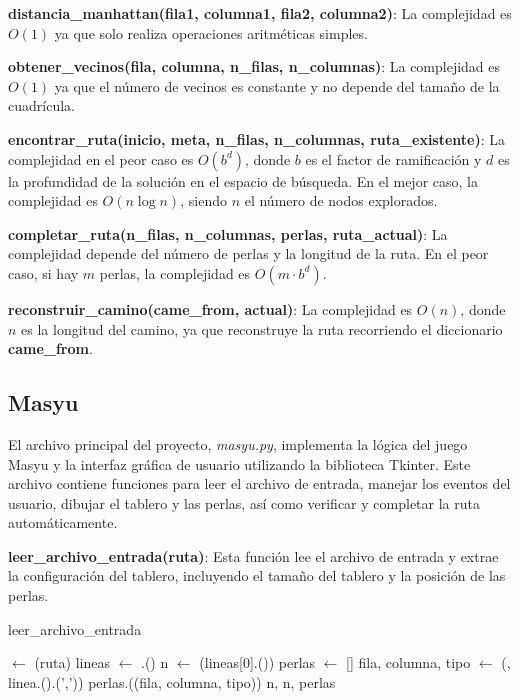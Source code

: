 \documentclass{article}
\begin{document}
\textbf{distancia\_manhattan(fila1, columna1, fila2, columna2)}: La complejidad es \(O(1)\) ya que solo realiza operaciones aritméticas simples.

\textbf{obtener\_vecinos(fila, columna, n\_filas, n\_columnas)}: La complejidad es \(O(1)\) ya que el número de vecinos es constante y no depende del tamaño de la cuadrícula.

\textbf{encontrar\_ruta(inicio, meta, n\_filas, n\_columnas, ruta\_existente)}: La complejidad en el peor caso es \(O(b^d)\), donde \(b\) es el factor de ramificación y \(d\) es la profundidad de la solución en el espacio de búsqueda. En el mejor caso, la complejidad es \(O(n \log n)\), siendo \(n\) el número de nodos explorados.

\textbf{completar\_ruta(n\_filas, n\_columnas, perlas, ruta\_actual)}: La complejidad depende del número de perlas y la longitud de la ruta. En el peor caso, si hay \(m\) perlas, la complejidad es \(O(m \cdot b^d)\).

\textbf{reconstruir\_camino(came\_from, actual)}: La complejidad es \(O(n)\), donde \(n\) es la longitud del camino, ya que reconstruye la ruta recorriendo el diccionario \textbf{came\_from}.

\subsection{Masyu}

El archivo principal del proyecto, \textit{masyu.py}, implementa la lógica del juego Masyu y la interfaz gráfica de usuario utilizando la biblioteca Tkinter. Este archivo contiene funciones para leer el archivo de entrada, manejar los eventos del usuario, dibujar el tablero y las perlas, así como verificar y completar la ruta automáticamente.

\textbf{leer\_archivo\_entrada(ruta)}: Esta función lee el archivo de entrada y extrae la configuración del tablero, incluyendo el tamaño del tablero y la posición de las perlas.

\begin{algorithm}[H]
\caption{leer\_archivo\_entrada}
\begin{algorithmic}[1]
    \State {} $\leftarrow$ (ruta)
    \State lineas $\leftarrow$ .()
    \State n $\leftarrow$ (lineas[0].())
    \State perlas $\leftarrow$ []
        \State fila, columna, tipo $\leftarrow$ (, linea.().(','))
        \State perlas.((fila, columna, tipo))
    \EndFor
    \State \Return n, n, perlas
\EndProcedure
\end{algorithmic}
\end{algorithm}
\end{document}
